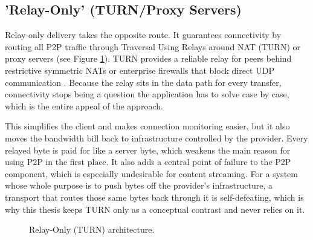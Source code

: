 \subsection{'Relay-Only' (TURN/Proxy Servers)}
\indent \par Relay-only delivery takes the opposite route. It guarantees connectivity by routing all P2P traffic through Traversal Using Relays around NAT (TURN) or proxy servers (see Figure \ref{fig:turn_architecture}). TURN provides a reliable relay for peers behind restrictive symmetric NATs or enterprise firewalls that block direct UDP communication \cite{relays_turn}. Because the relay sits in the data path for every transfer, connectivity stops being a question the application has to solve case by case, which is the entire appeal of the approach.

\par This simplifies the client and makes connection monitoring easier, but it also moves the bandwidth bill back to infrastructure controlled by the provider. Every relayed byte is paid for like a server byte, which weakens the main reason for using P2P in the first place. It also adds a central point of failure to the P2P component, which is especially undesirable for content streaming. For a system whose whole purpose is to push bytes off the provider's infrastructure, a transport that routes those same bytes back through it is self-defeating, which is why this thesis keeps TURN only as a conceptual contrast and never relies on it.

\begin{figure}[htbp]
    \centering
    \caption{Relay-Only (TURN) architecture.}
    \label{fig:turn_architecture}
\end{figure}

